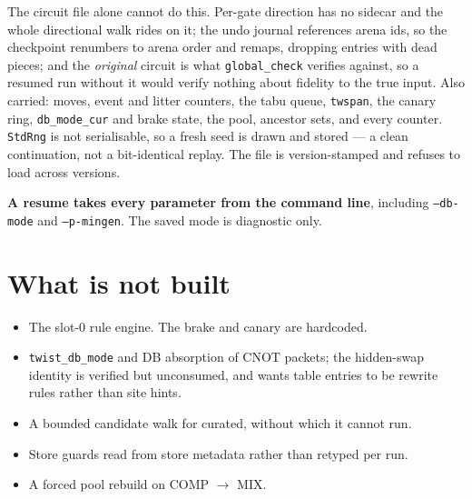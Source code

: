 \documentclass[11pt]{article}
\begin{document}
The circuit file alone cannot do this. Per-gate direction has no sidecar and the
whole directional walk rides on it; the undo journal references arena ids, so the
checkpoint renumbers to arena order and remaps, dropping entries with dead
pieces; and the \emph{original} circuit is what \texttt{global_check} verifies
against, so a resumed run without it would verify nothing about fidelity to the
true input. Also carried: moves, event and litter counters, the tabu queue,
\texttt{twspan}, the canary ring, \texttt{db_mode_cur} and brake state, the pool,
ancestor sets, and every counter. \texttt{StdRng} is not serialisable, so a fresh
seed is drawn and stored --- a clean continuation, not a bit-identical replay.
The file is version-stamped and refuses to load across versions.

\textbf{A resume takes every parameter from the command line}, including
\texttt{--db-mode} and \texttt{--p-mingen}. The saved mode is diagnostic only.

\section{What is not built}

\begin{itemize}
\item The slot-0 rule engine. The brake and canary are hardcoded.
\item \texttt{twist_db_mode} and DB absorption of CNOT packets; the hidden-swap
identity is verified but unconsumed, and wants table entries to be rewrite rules
rather than site hints.
\item A bounded candidate walk for curated, without which it cannot run.
\item Store guards read from store metadata rather than retyped per run.
\item A forced pool rebuild on COMP $\to$ MIX.
\end{itemize}
\end{document}

